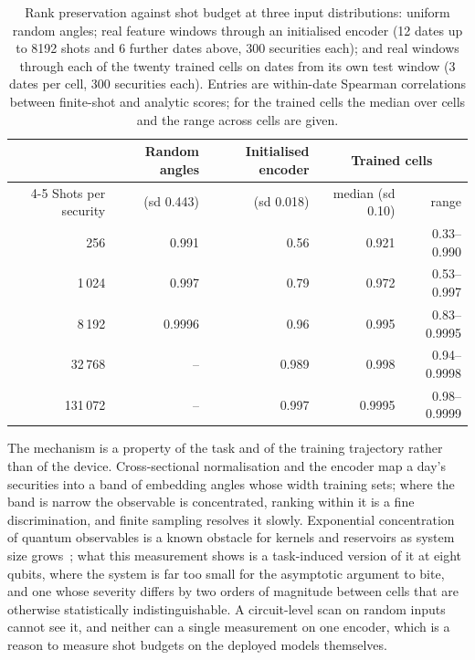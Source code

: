 \begin{table}[t]
  \centering
  \caption{Rank preservation against shot budget at three input
  distributions: uniform random angles; real feature windows through an
  initialised encoder (12 dates up to \num{8192} shots and 6 further dates
  above, 300 securities each); and real windows
  through each of the twenty trained cells on dates from its own test window
  (3 dates per cell, 300 securities each). Entries are within-date Spearman
  correlations between finite-shot and analytic scores; for the trained
  cells the median over cells and the range across cells are given.}
  \label{tab:shots}
  \small
  \begin{tabular}{rrrrr}
    \toprule
    & Random angles & Initialised encoder & \multicolumn{2}{c}{Trained cells} \\
    \cmidrule(lr){4-5}
    Shots per security & (sd \num{0.443}) & (sd \num{0.018}) & median (sd \num{0.10}) & range \\
    \midrule
    256     & 0.991  & 0.56  & 0.921 & 0.33--0.990 \\
    1\,024  & 0.997  & 0.79  & 0.972 & 0.53--0.997 \\
    8\,192  & 0.9996 & 0.96  & 0.995 & 0.83--0.9995 \\
    32\,768 & --     & 0.989 & 0.998 & 0.94--0.9998 \\
    131\,072& --     & 0.997 & 0.9995 & 0.98--0.9999 \\
    \bottomrule
  \end{tabular}
\end{table}

The mechanism is a property of the task and of the training trajectory
rather than of the device. Cross-sectional normalisation and the encoder map
a day's securities into a band of embedding angles whose width training sets;
where the band is narrow the observable is concentrated, ranking within it is
a fine discrimination, and finite sampling resolves it slowly. Exponential
concentration of quantum observables is a known obstacle for kernels and
reservoirs as system size grows~\citep{miroszewski2024search}; what this
measurement shows is a task-induced version of it at eight qubits, where the
system is far too small for the asymptotic argument to bite, and one whose
severity differs by two orders of magnitude between cells that are otherwise
statistically indistinguishable. A circuit-level scan on random inputs cannot
see it, and neither can a single measurement on one encoder, which is a reason
to measure shot budgets on the deployed models themselves.


